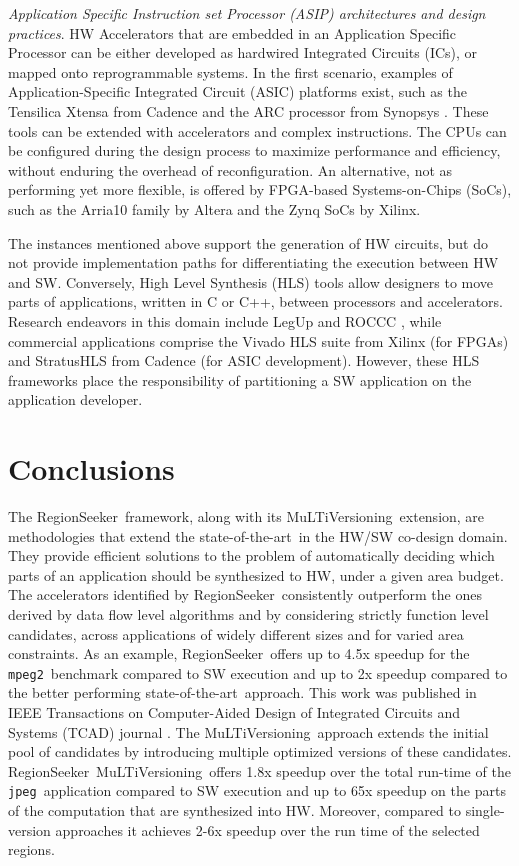 \documentclass[]{usiinfthesis}
\newcommand{\rseeker}{{RegionSeeker}}
\newcommand{\multi}{MuLTiVersioning}
\newcommand{\SoTA}{{state-of-the-art}}
\newcommand{\jpeg}{\texttt{jpeg}}
\newcommand{\mpeg}{\texttt{mpeg2}}
\begin{document}
\emph{Application Specific Instruction set Processor (ASIP) architectures and design practices}.
HW Accelerators that are embedded
in an Application Specific Processor can be either developed as hardwired
Integrated Circuits (ICs), or mapped onto reprogrammable systems. In the
first scenario, examples of Application-Specific Integrated Circuit (ASIC) 
platforms exist, such as the
Tensilica Xtensa from Cadence \cite{TensilicaMar17} and the ARC
processor from Synopsys \cite{ArcDec16}. These tools can be extended with
accelerators and complex instructions. The CPUs can be configured
during the design process to maximize performance and efficiency,
without enduring the overhead of reconfiguration. An alternative, not 
as performing yet more flexible, is offered by FPGA-based
Systems-on-Chips (SoCs), such as the Arria10 family \cite{ArriaNov16} by Altera 
and the Zynq SoCs \cite{ZynqMar17} by Xilinx.\par

The instances mentioned above support the generation of HW
circuits, but do not provide implementation paths for differentiating the
execution between HW and SW. Conversely, High Level
Synthesis (HLS) tools allow designers to move parts of applications, 
written in C or C++, between processors and
accelerators. Research endeavors in this domain include LegUp
\cite{CanisSep13} and ROCCC \cite{GuoMar05}, while commercial
applications comprise the Vivado HLS \cite{VivadoHLSMar17} suite
from Xilinx (for FPGAs) and StratusHLS \cite{StratusHLSApr16} from
Cadence (for ASIC development).
However, these HLS frameworks place the responsibility of
partitioning a SW application on the application developer.\par

\section{Conclusions}
\label{sec:rs_conclusions}

The \rseeker\ framework, along with its %
\multi\ extension, are methodologies that extend the \SoTA\ in the HW/SW co-design domain. They provide
efficient solutions to the problem of automatically deciding which parts of an application should
be synthesized to HW, under a given area budget. The accelerators identified by \rseeker\ 
consistently outperform the ones derived by data flow level algorithms and by considering strictly function 
level candidates, across applications of widely different sizes and for varied area constraints.
As an example, \rseeker\ offers up to 4.5x speedup for the \mpeg\ benchmark compared to SW
execution and up to 2x speedup compared to the better performing \SoTA\ approach. 
This work was published in IEEE Transactions on Computer-Aided Design of Integrated 
Circuits and Systems (TCAD) journal \cite{ZacharopoulosApr19}.
The \multi\ approach extends the initial pool of candidates by introducing multiple optimized
versions of these candidates. 
\rseeker\ \multi\ offers 1.8x speedup over the total run-time of the 
\jpeg\ application compared to SW execution and up
to 65x speedup on the parts of the computation that 
are synthesized into HW. Moreover, compared to single-version approaches it achieves
2-6x speedup over the run time of the selected regions.
\end{document}
